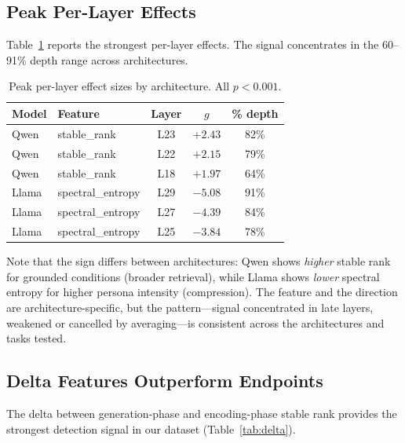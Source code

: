 \documentclass[11pt,a4paper]{article}
\begin{document}
\subsection{Peak Per-Layer Effects}

Table~\ref{tab:peaks} reports the strongest per-layer effects. The
signal concentrates in the 60--91\% depth range across architectures.

\begin{table}[ht]
\centering
\caption{Peak per-layer effect sizes by architecture. All $p < 0.001$.}
\label{tab:peaks}
\begin{tabular}{llccc}
\toprule
\textbf{Model} & \textbf{Feature} & \textbf{Layer} & \textbf{$g$} & \textbf{\% depth} \\
\midrule
Qwen & stable\_rank & L23 & $+2.43$ & 82\% \\
Qwen & stable\_rank & L22 & $+2.15$ & 79\% \\
Qwen & stable\_rank & L18 & $+1.97$ & 64\% \\
\midrule
Llama & spectral\_entropy & L29 & $-5.08$ & 91\% \\
Llama & spectral\_entropy & L27 & $-4.39$ & 84\% \\
Llama & spectral\_entropy & L25 & $-3.84$ & 78\% \\
\bottomrule
\end{tabular}
\end{table}

Note that the sign differs between architectures: Qwen shows
\emph{higher} stable rank for grounded conditions (broader retrieval),
while Llama shows \emph{lower} spectral entropy for higher persona
intensity (compression). The feature and the direction are
architecture-specific, but the pattern---signal concentrated in late
layers, weakened or cancelled by averaging---is consistent across the
architectures and tasks tested.

\subsection{Delta Features Outperform Endpoints}

The delta between generation-phase and encoding-phase stable rank
provides the strongest detection signal in our dataset
(Table~\ref{tab:delta}).
\end{document}
